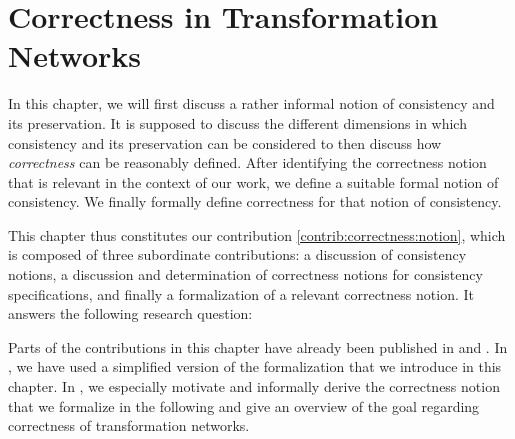 \chapter{Correctness in Transformation Networks
}
\label{chap:correctness}




In this chapter, we will first discuss a rather informal notion of consistency and its preservation. It is supposed to discuss the different dimensions in which consistency and its preservation can be considered to then discuss how \emph{correctness} can be reasonably defined.
After identifying the correctness notion that is relevant in the context of our work, we define a suitable formal notion of consistency.
We finally formally define correctness for that notion of consistency.

This chapter thus constitutes our contribution \autoref{contrib:correctness:notion}, which is composed of three subordinate contributions: a discussion of consistency notions, a discussion and determination of correctness notions for consistency specifications, and finally a formalization of a relevant correctness notion.
It answers the following research question:


Parts of the contributions in this chapter have already been published in  and .
In , we have used a simplified version of the formalization that we introduce in this chapter.
In , we especially motivate and informally derive the correctness notion that we formalize in the following and give an overview of the goal regarding correctness of transformation networks.







